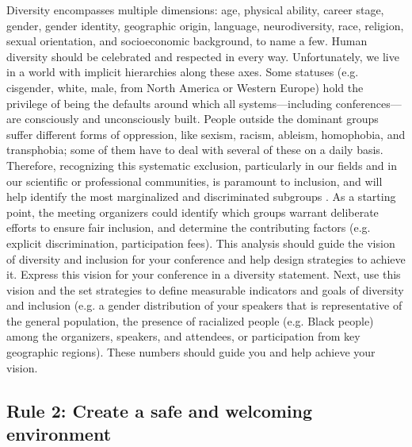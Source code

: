 \documentclass[10pt,letterpaper]{article}
\begin{document}
Diversity encompasses multiple dimensions: age, physical ability, career stage, gender, gender identity, geographic origin, language, neurodiversity, race, religion, sexual orientation, and socioeconomic background, to name a few.
Human diversity should be celebrated and respected in every way. 
Unfortunately, we live in a world with implicit hierarchies along these axes. 
Some statuses (e.g. cisgender, white, male, from North America or Western Europe) hold the privilege of being the defaults around which all systems—including conferences—are consciously and unconsciously built. 
People outside the dominant groups suffer different forms of oppression, like sexism, racism, ableism, homophobia, and transphobia; some of them have to deal with several of these on a daily basis.
Therefore, recognizing this systematic exclusion, particularly in our fields and in our scientific or professional communities, is paramount to inclusion, and will help identify the most marginalized and discriminated subgroups \cite{timperleyHeMoanaPukepuke2020}.
As a starting point, the meeting organizers could identify which groups warrant deliberate efforts to ensure fair inclusion, and determine the contributing factors (e.g. explicit discrimination, participation fees).
This analysis should guide the vision of diversity and inclusion for your conference and help design strategies to achieve it. 
Express this vision for your conference in a diversity statement. 
Next, use this vision and the set strategies to define measurable indicators and goals of diversity and inclusion (e.g. a gender distribution of your speakers that is representative of the general population, the presence of racialized people (e.g. Black people) among the organizers, speakers, and attendees, or participation from key geographic regions). 
These numbers should guide you and help achieve your vision.




\subsection*{Rule 2: Create a safe and welcoming environment}
\label{rule_inclusion}
\end{document}
